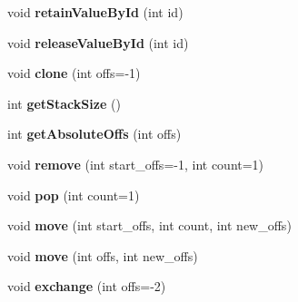 \begin{DoxyCompactItemize}
\item 
void {\bfseries retain\+Value\+By\+Id} (int id)\hypertarget{class_object_script_1_1_o_s_aa163519f980b6646e7f478251ff2d2c1}{}\label{class_object_script_1_1_o_s_aa163519f980b6646e7f478251ff2d2c1}

\item 
void {\bfseries release\+Value\+By\+Id} (int id)\hypertarget{class_object_script_1_1_o_s_a7aaf9e55bfff80cab32f4a75324981a9}{}\label{class_object_script_1_1_o_s_a7aaf9e55bfff80cab32f4a75324981a9}

\item 
void {\bfseries clone} (int offs=-\/1)\hypertarget{class_object_script_1_1_o_s_a28e6bcbead41036e9d13e7487c89feac}{}\label{class_object_script_1_1_o_s_a28e6bcbead41036e9d13e7487c89feac}

\item 
int {\bfseries get\+Stack\+Size} ()\hypertarget{class_object_script_1_1_o_s_ac5c14abb211a4c6738faca80bf0a5b1a}{}\label{class_object_script_1_1_o_s_ac5c14abb211a4c6738faca80bf0a5b1a}

\item 
int {\bfseries get\+Absolute\+Offs} (int offs)\hypertarget{class_object_script_1_1_o_s_a713553b0197b87821f68609ac9a74239}{}\label{class_object_script_1_1_o_s_a713553b0197b87821f68609ac9a74239}

\item 
void {\bfseries remove} (int start\+\_\+offs=-\/1, int count=1)\hypertarget{class_object_script_1_1_o_s_a5f945af35c20439a5ae8da34e2f1b5e4}{}\label{class_object_script_1_1_o_s_a5f945af35c20439a5ae8da34e2f1b5e4}

\item 
void {\bfseries pop} (int count=1)\hypertarget{class_object_script_1_1_o_s_a45e85891e165af688e9241396f479dad}{}\label{class_object_script_1_1_o_s_a45e85891e165af688e9241396f479dad}

\item 
void {\bfseries move} (int start\+\_\+offs, int count, int new\+\_\+offs)\hypertarget{class_object_script_1_1_o_s_ada25bee51e76e7af3fc1a31ff0ee8368}{}\label{class_object_script_1_1_o_s_ada25bee51e76e7af3fc1a31ff0ee8368}

\item 
void {\bfseries move} (int offs, int new\+\_\+offs)\hypertarget{class_object_script_1_1_o_s_a61b8c083a78571f9831bc8c8363bb1b7}{}\label{class_object_script_1_1_o_s_a61b8c083a78571f9831bc8c8363bb1b7}

\item 
void {\bfseries exchange} (int offs=-\/2)\hypertarget{class_object_script_1_1_o_s_aa371b423a0656db9d764b1bbd9cb6e8d}{}\label{class_object_script_1_1_o_s_aa371b423a0656db9d764b1bbd9cb6e8d}


\end{DoxyCompactItemize}
